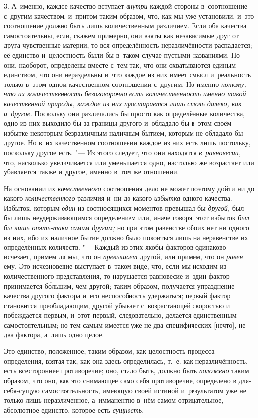 3. А~именно, каждое качество вступает {\em внутри} каждой стороны в~соотношение
с~другим качеством, и~притом таким образом, что, как мы уже установили, и~это
соотношение должно быть лишь количественным различием. Если оба качества
самостоятельны, если, скажем примерно, они взяты как независимые друг от друга
чувственные материи, то вся определённость неразличённости распадается; её
единство и~целостность были бы в~таком случае пустыми названиями. Но они,
наоборот, определены вместе с~тем так, что они охватываются единым единством,
что они нераздельны и~что каждое из них имеет смысл и~реальность только в~этом
одном качественном соотношении с~другим. Но именно {\em потому, что их
количественность безоговорочно есть количественность именно такой качественной
природы, каждое из них простирается лишь столь далеко, как и~другое}. Поскольку
они различались бы просто как определённые количества, одно из них выходило бы
за границы другого и~обладало бы в~этом своём избытке некоторым безразличным
наличным бытием, которым не обладало бы другое. Но в~их качественном
соотношении каждое из них есть лишь постольку, поскольку другое есть. "--- Из
этого следует, что они находятся {\em в~равновесии,} что, насколько
увеличивается или уменьшается одно, настолько же возрастает или убавляется
также и~другое, именно в~том же отношении.

На основании их {\em качественного} соотношения дело не может поэтому дойти ни
до какого {\em количественного} различия и~ни до какого {\em избытка} одного
качества. Избыток, которым {\em один} из соотносящихся моментов превышал бы
{\em другой,} был бы лишь неудерживающимся определением или, иначе говоря, этот
избыток {\em был бы лишь опять-таки самим другим;} но при этом равенстве обоих
нет ни одного из них, ибо их наличное бытие должно было покоиться лишь на
неравенстве их определённых количеств. "--- Каждый из этих якобы факторов
одинаково исчезает, примем ли мы, что он {\em превышает} другой, или примем,
что он {\em равен} ему. Это исчезновение выступает в~таком виде, что, если мы
исходим из количественного представления, то нарушается равновесие и~один
фактор принимается б\'{о}льшим, чем другой; таким образом, получается
упразднение качества другого фактора и~его неспособность удержаться; первый
фактор становится преобладающим, другой убывает с~возрастающей скоростью и
побеждается первым, и~этот первый, следовательно, делается единственным
самостоятельным; но тем самым имеется уже не два специфических [нечто], не два
фактора, а~лишь одно целое.

Это единство, положенное, таким образом, как целостность процесса определения,
взятая так, как она здесь определилась, т.~е. как неразличённость, есть
всестороннее противоречие; оно, стало быть, должно быть {\em положено} таким
образом, что оно, как это снимающее само себя противоречие, определено в
для-себя-сущую самостоятельность, имеющую своей истиной и~результатом уже не
только лишь неразличенное, а~имманентно в~нём самом отрицательное, абсолютное
единство, которое есть {\em сущность}.

